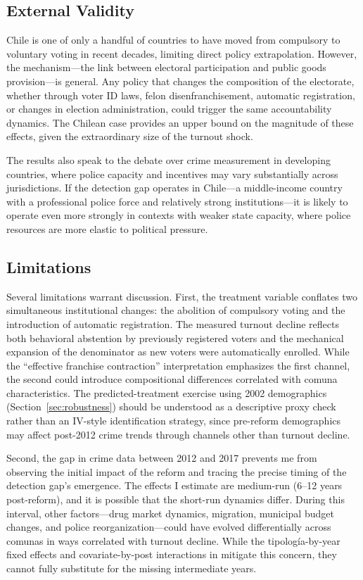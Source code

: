 \documentclass[12pt]{article}
\begin{document}
\subsection{External Validity}

Chile is one of only a handful of countries to have moved from compulsory to voluntary voting in recent decades, limiting direct policy extrapolation. However, the mechanism---the link between electoral participation and public goods provision---is general. Any policy that changes the composition of the electorate, whether through voter ID laws, felon disenfranchisement, automatic registration, or changes in election administration, could trigger the same accountability dynamics. The Chilean case provides an upper bound on the magnitude of these effects, given the extraordinary size of the turnout shock.

The results also speak to the debate over crime measurement in developing countries, where police capacity and incentives may vary substantially across jurisdictions. If the detection gap operates in Chile---a middle-income country with a professional police force and relatively strong institutions---it is likely to operate even more strongly in contexts with weaker state capacity, where police resources are more elastic to political pressure.

\subsection{Limitations}

Several limitations warrant discussion. First, the treatment variable conflates two simultaneous institutional changes: the abolition of compulsory voting and the introduction of automatic registration. The measured turnout decline reflects both behavioral abstention by previously registered voters and the mechanical expansion of the denominator as new voters were automatically enrolled. While the ``effective franchise contraction'' interpretation emphasizes the first channel, the second could introduce compositional differences correlated with comuna characteristics. The predicted-treatment exercise using 2002 demographics (Section~\ref{sec:robustness}) should be understood as a descriptive proxy check rather than an IV-style identification strategy, since pre-reform demographics may affect post-2012 crime trends through channels other than turnout decline.

Second, the gap in crime data between 2012 and 2017 prevents me from observing the initial impact of the reform and tracing the precise timing of the detection gap's emergence. The effects I estimate are medium-run (6--12 years post-reform), and it is possible that the short-run dynamics differ. During this interval, other factors---drug market dynamics, migration, municipal budget changes, and police reorganization---could have evolved differentially across comunas in ways correlated with turnout decline. While the tipolog\'{i}a-by-year fixed effects and covariate-by-post interactions in  mitigate this concern, they cannot fully substitute for the missing intermediate years.
\end{document}
